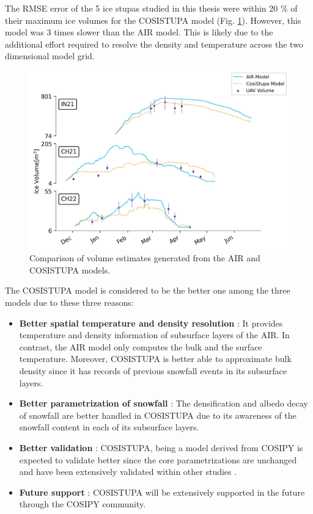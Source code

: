 The \ac{RMSE} error of the 5 ice stupas studied in this thesis were within 20 \% of their maximum ice volumes
for the COSISTUPA model (Fig. \ref{fig:Cosistupa}).  However, this model was 3 times slower than the AIR model.
This is likely due to the additional effort required to resolve the density and temperature across the two
dimensional model grid.

\begin{figure}[t]
	\centering
	\includegraphics[width=\textwidth]{figs/model_compare.jpg}

	\caption{Comparison of volume estimates generated from the AIR and COSISTUPA models.}

	\label{fig:Cosistupa}
\end{figure}

The COSISTUPA model is considered to be the better one among the three models due to these three reasons:

\begin{itemize}

	\item \textbf{Better spatial temperature and density resolution} : It provides temperature and density
	      information of subsurface layers of the AIR. In contrast, the AIR model only computes the bulk and the
	      surface temperature. Moreover, COSISTUPA is better able to approximate bulk density since it has records of
	      previous snowfall events in its subsurface layers.

	\item \textbf{Better parametrization of snowfall} : The densification and albedo decay of snowfall are better
	      handled in COSISTUPA due to its awareness of the snowfall content in each of its subsurface layers.

	\item \textbf{Better validation} : COSISTUPA, being a model derived from COSIPY is expected to validate better
	      since the core parametrizations are unchanged and have been extensively validated within other studies \citep{arndtAtmosphereDrivenMassBalance2021}.

	\item \textbf{Future support} : COSISTUPA will be extensively supported in the future through the COSIPY
	      community.

\end{itemize}


